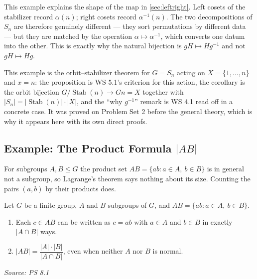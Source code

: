 \documentclass[11pt]{report}
\newcommand{\srcline}[1]{\par\hfill{\footnotesize\textit{Source: #1}}}
\begin{document}
\begin{rembox}\label{rem:why-bijection-g-h-to-h-g-uses-g-1}
This example explains the shape of the map in \ref{sec:leftright}. Left cosets of the stabilizer record $\alpha(n)$; right cosets record $\alpha^{-1}(n)$. The two decompositions of $S_n$ are therefore genuinely different --- they sort permutations by different data --- but they are matched by the operation $\alpha \mapsto \alpha^{-1}$, which converts one datum into the other. This is exactly why the natural bijection is $gH \mapsto Hg^{-1}$ and not $gH \mapsto Hg$.
\end{rembox}

\begin{rembox}\label{rem:instance-orbit-stabilizer}
This example is the orbit--stabilizer theorem for $G = S_n$ acting on $X = \{1, \ldots, n\}$ and $x = n$: the proposition is WS 5.1's criterion for this action, the corollary is the orbit bijection $G/\operatorname{Stab}(n) \to Gn = X$ together with $|S_n| = |\operatorname{Stab}(n)| \cdot |X|$, and the ``why $g^{-1}$'' remark is WS 4.1 read off in a concrete case. It was proved on Problem Set 2 before the general theory, which is why it appears here with its own direct proofs.
\end{rembox}

\subsection{\texorpdfstring{Example: The Product Formula $|AB|$}{Example: The Product Formula |AB|}}\label{sub:product-formula}

For subgroups $A, B \leq G$ the product set $AB = \{ab : a \in A,\ b \in B\}$ is in general not a subgroup, so Lagrange's theorem says nothing about its size. Counting the pairs $(a, b)$ by their products does.

\begin{propbox}\label{prop:product-formula}
Let $G$ be a finite group, $A$ and $B$ subgroups of $G$, and $AB = \{ab : a \in A,\ b \in B\}$.
\begin{enumerate}
    \item Each $c \in AB$ can be written as $c = ab$ with $a \in A$ and $b \in B$ in exactly $|A \cap B|$ ways.
    \item $|AB| = \dfrac{|A| \cdot |B|}{|A \cap B|}$, even when neither $A$ nor $B$ is normal.
\end{enumerate}
\srcline{PS 8.1}
\end{propbox}
\end{document}
